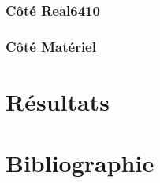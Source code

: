 \documentclass[a4,french,12pt]{article}
\begin{document}
\subsubsection{Côté Real6410}

\subsubsection{Côté Matériel}

\newpage
\section{Résultats}

\newpage
\section{Bibliographie}
\end{document}
